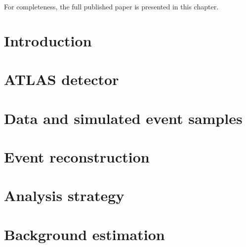 For completeness, the full published paper is presented in this chapter.


\section{Introduction}
\label{sec:intro}



\section{ATLAS detector}
\label{sec:detector}



\section{Data and simulated event samples}
\label{sec:DataAndMC}


\section{Event reconstruction}
\label{sec:Reco}


\section{Analysis strategy}
\label{sec:Analysis}


\section{Background estimation}
\label{sec:bkgs}



